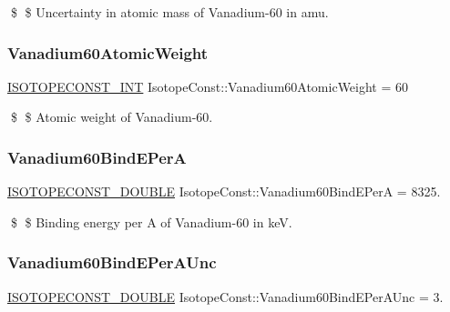 \$ \$ Uncertainty in atomic mass of Vanadium-\/60 in amu. \mbox{\label{group___isotope_const-_vanadium-_v60_ga76a3bbf52e39be9dca187654c4817d3a}} 
\subsubsection{\texorpdfstring{Vanadium60\+Atomic\+Weight}{Vanadium60AtomicWeight}}
{\footnotesize\ttfamily \mbox{\hyperlink{group___isotope_const-_macros_ga5f18360b3e99483a35c32d789e62621c}{I\+S\+O\+T\+O\+P\+E\+C\+O\+N\+S\+T\+\_\+\+I\+NT}} Isotope\+Const\+::\+Vanadium60\+Atomic\+Weight = 60}

\$ \$ Atomic weight of Vanadium-\/60. \mbox{\label{group___isotope_const-_vanadium-_v60_ga1792cbf0206889360ec1e36e35b4244e}} 
\subsubsection{\texorpdfstring{Vanadium60\+Bind\+E\+PerA}{Vanadium60BindEPerA}}
{\footnotesize\ttfamily \mbox{\hyperlink{group___isotope_const-_macros_ga8f45a7272ce02c0b4c65c44636ed719a}{I\+S\+O\+T\+O\+P\+E\+C\+O\+N\+S\+T\+\_\+\+D\+O\+U\+B\+LE}} Isotope\+Const\+::\+Vanadium60\+Bind\+E\+PerA = 8325.}

\$ \$ Binding energy per A of Vanadium-\/60 in keV. \mbox{\label{group___isotope_const-_vanadium-_v60_gabee632092ac872a820ac4b4ffff67e2c}} 
\subsubsection{\texorpdfstring{Vanadium60\+Bind\+E\+Per\+A\+Unc}{Vanadium60BindEPerAUnc}}
{\footnotesize\ttfamily \mbox{\hyperlink{group___isotope_const-_macros_ga8f45a7272ce02c0b4c65c44636ed719a}{I\+S\+O\+T\+O\+P\+E\+C\+O\+N\+S\+T\+\_\+\+D\+O\+U\+B\+LE}} Isotope\+Const\+::\+Vanadium60\+Bind\+E\+Per\+A\+Unc = 3.}

